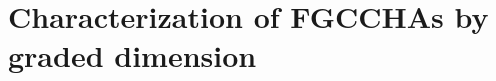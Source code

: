 \documentclass[11pt]{amsart}
\theoremstyle{definition}
\numberwithin{equation}{section}
\newcommand{\FGCCHAs}{\textsf{FGCCHA}s\xspace}
\begin{document}

%

\section{Characterization of \FGCCHAs by graded dimension}
\label{sec:isoclassification}
\end{document}
